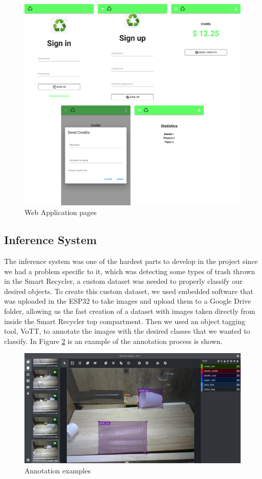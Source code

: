 \documentclass[a4paper,11pt]{article}
\begin{document}
\begin{figure}[H]
  \centering
  \includegraphics[scale=0.1]{Figures/front_pages.png}
  \caption{\small{Web Application pages}}
  \label{fig:front_pages}
\end{figure}

\subsection{Inference System}
The inference system was one of the hardest parts to develop in the project since we had a problem specific to it, which was detecting some types of trash thrown in the Smart Recycler, a custom dataset was needed to properly classify our desired objects. To create this custom dataset, we used embedded software that was uploaded in the ESP32 to take images and upload them to a Google Drive folder, allowing us the fast creation of a dataset with images taken directly from inside the Smart Recycler top compartment. Then we used an object tagging tool, VoTT, to annotate the images with the desired classes that we wanted to classify. In Figure \ref{fig:annotation_example} is an example of the annotation process is shown.

\begin{figure}[H]
  \centering
  \includegraphics[width=12.5cm]{Figures/annotation_example.png}
  \caption{\small{Annotation examples}}
  \label{fig:annotation_example}
\end{figure}
\end{document}
